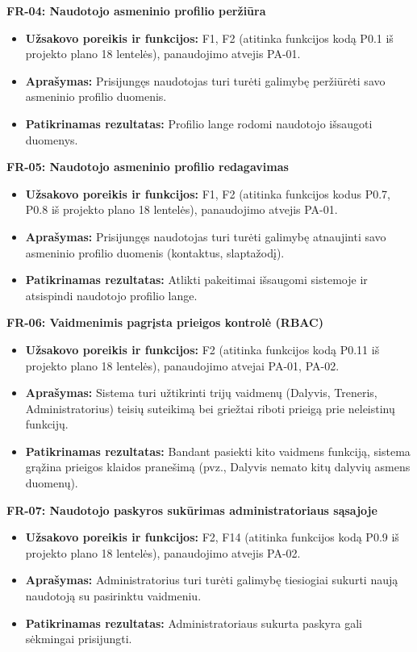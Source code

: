 \vspace{0.3cm}
\noindent\textbf{FR-04: Naudotojo asmeninio profilio peržiūra}
\begin{itemize}
    \item \textbf{Užsakovo poreikis ir funkcijos:} F1, F2 (atitinka funkcijos kodą P0.1 iš projekto plano 18 lentelės), panaudojimo atvejis PA-01.
    \item \textbf{Aprašymas:} Prisijungęs naudotojas turi turėti galimybę peržiūrėti savo asmeninio profilio duomenis.
    \item \textbf{Patikrinamas rezultatas:} Profilio lange rodomi naudotojo išsaugoti duomenys.
\end{itemize}

\vspace{0.3cm}
\noindent\textbf{FR-05: Naudotojo asmeninio profilio redagavimas}
\begin{itemize}
    \item \textbf{Užsakovo poreikis ir funkcijos:} F1, F2 (atitinka funkcijos kodus P0.7, P0.8 iš projekto plano 18 lentelės), panaudojimo atvejis PA-01.
    \item \textbf{Aprašymas:} Prisijungęs naudotojas turi turėti galimybę atnaujinti savo asmeninio profilio duomenis (kontaktus, slaptažodį).
    \item \textbf{Patikrinamas rezultatas:} Atlikti pakeitimai išsaugomi sistemoje ir atsispindi naudotojo profilio lange.
\end{itemize}

\vspace{0.3cm}
\noindent\textbf{FR-06: Vaidmenimis pagrįsta prieigos kontrolė (RBAC)}
\begin{itemize}
    \item \textbf{Užsakovo poreikis ir funkcijos:} F2 (atitinka funkcijos kodą P0.11 iš projekto plano 18 lentelės), panaudojimo atvejai PA-01, PA-02.
    \item \textbf{Aprašymas:} Sistema turi užtikrinti trijų vaidmenų (Dalyvis, Treneris, Administratorius) teisių suteikimą bei griežtai riboti prieigą prie neleistinų funkcijų.
    \item \textbf{Patikrinamas rezultatas:} Bandant pasiekti kito vaidmens funkciją, sistema grąžina prieigos klaidos pranešimą (pvz., Dalyvis nemato kitų dalyvių asmens duomenų).
\end{itemize}

\vspace{0.3cm}
\noindent\textbf{FR-07: Naudotojo paskyros sukūrimas administratoriaus sąsajoje}
\begin{itemize}
    \item \textbf{Užsakovo poreikis ir funkcijos:} F2, F14 (atitinka funkcijos kodą P0.9 iš projekto plano 18 lentelės), panaudojimo atvejis PA-02.
    \item \textbf{Aprašymas:} Administratorius turi turėti galimybę tiesiogiai sukurti naują naudotoją su pasirinktu vaidmeniu.
    \item \textbf{Patikrinamas rezultatas:} Administratoriaus sukurta paskyra gali sėkmingai prisijungti.
\end{itemize}

